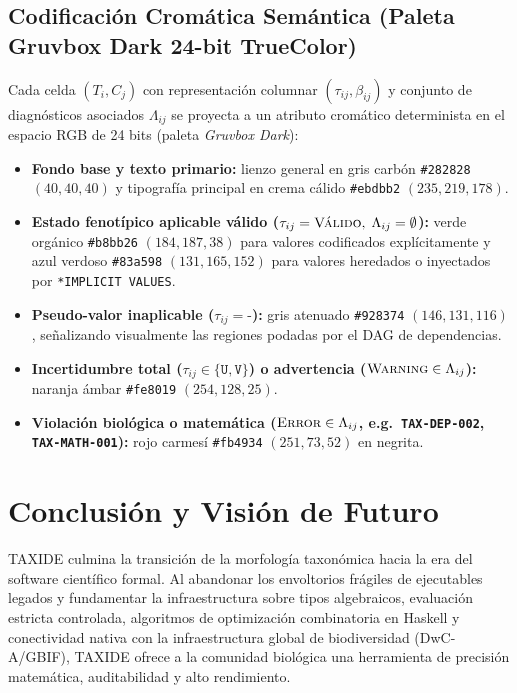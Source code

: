 \documentclass[11pt,a4paper]{article}
\theoremstyle{definition}
\theoremstyle{remark}
\begin{document}
\subsection{Codificación Cromática Semántica (Paleta Gruvbox Dark 24-bit TrueColor)}
Cada celda $(T_i, C_j)$ con representación columnar $(\tau_{ij}, \beta_{ij})$ y conjunto de diagnósticos asociados $\Lambda_{ij}$ se proyecta a un atributo cromático determinista en el espacio RGB de 24 bits (paleta \emph{Gruvbox Dark}):
\begin{itemize}
    \item \textbf{Fondo base y texto primario:} lienzo general en gris carbón \texttt{\#282828} $(40, 40, 40)$ y tipografía principal en crema cálido \texttt{\#ebdbb2} $(235, 219, 178)$.
    \item \textbf{Estado fenotípico aplicable válido ($\tau_{ij} = \textsc{Válido}, \; \Lambda_{ij} = \emptyset$):} verde orgánico \texttt{\#b8bb26} $(184, 187, 38)$ para valores codificados explícitamente y azul verdoso \texttt{\#83a598} $(131, 165, 152)$ para valores heredados o inyectados por \texttt{*IMPLICIT VALUES}.
    \item \textbf{Pseudo-valor inaplicable ($\tau_{ij} = \texttt{-}$):} gris atenuado \texttt{\#928374} $(146, 131, 116)$, señalizando visualmente las regiones podadas por el DAG de dependencias.
    \item \textbf{Incertidumbre total ($\tau_{ij} \in \{\texttt{U}, \texttt{V}\}$) o advertencia ($\textsc{Warning} \in \Lambda_{ij}$):} naranja ámbar \texttt{\#fe8019} $(254, 128, 25)$.
    \item \textbf{Violación biológica o matemática ($\textsc{Error} \in \Lambda_{ij}$, e.g.\ \texttt{TAX-DEP-002}, \texttt{TAX-MATH-001}):} rojo carmesí \texttt{\#fb4934} $(251, 73, 52)$ en negrita.
\end{itemize}

\section{Conclusión y Visión de Futuro}
TAXIDE culmina la transición de la morfología taxonómica hacia la era del software científico formal. Al abandonar los envoltorios frágiles de ejecutables legados y fundamentar la infraestructura sobre tipos algebraicos, evaluación estricta controlada, algoritmos de optimización combinatoria en Haskell y conectividad nativa con la infraestructura global de biodiversidad (DwC-A/GBIF), TAXIDE ofrece a la comunidad biológica una herramienta de precisión matemática, auditabilidad y alto rendimiento.
\end{document}
